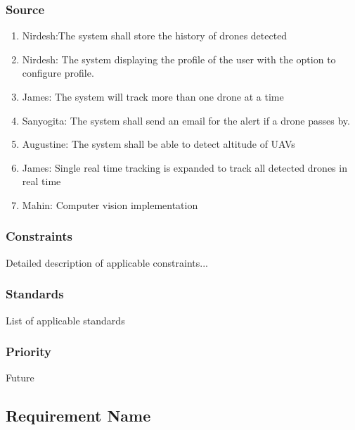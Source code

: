 \subsubsection{Source}
\begin{enumerate}
\item Nirdesh:The system shall store the history of drones detected
\item Nirdesh: The system displaying the profile of the user with the option to configure profile. 
\item James: The system will track more than one drone at a time
\item Sanyogita: The system shall send an email for the alert if a drone passes by.
\item Augustine: The system shall be able to detect altitude of UAVs
\item James: Single real time tracking is expanded to track all detected drones in real time

\item Mahin: Computer vision implementation
\end{enumerate}
\subsubsection{Constraints}
Detailed description of applicable constraints...
\subsubsection{Standards}
List of applicable standards
\subsubsection{Priority}
Future
\subsection{Requirement Name}
